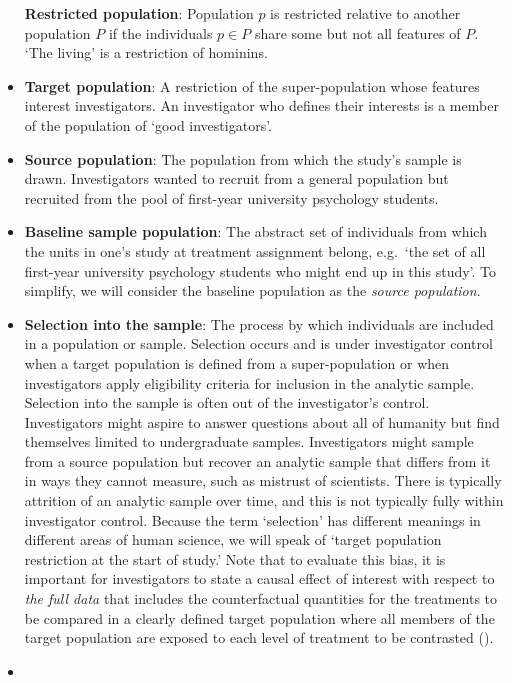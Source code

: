 \documentclass[
  single column]{article}
\begin{document}
\begin{itemize}
  \textbf{Restricted population}: Population \(p\) is restricted
  relative to another population \(P\) if the individuals \(p \in P\)
  share some but not all features of \(P\). `The living' is a
  restriction of hominins.
\item
  \textbf{Target population}: A restriction of the super-population
  whose features interest investigators. An investigator who defines
  their interests is a member of the population of `good investigators'.
\item
  \textbf{Source population}: The population from which the study's
  sample is drawn. Investigators wanted to recruit from a general
  population but recruited from the pool of first-year university
  psychology students.
\item
  \textbf{Baseline sample population}: The abstract set of individuals
  from which the units in one's study at treatment assignment belong,
  e.g.~`the set of all first-year university psychology students who
  might end up in this study'. To simplify, we will consider the
  baseline population as the \emph{source population}.
\item
  \textbf{Selection into the sample}: The process by which individuals
  are included in a population or sample. Selection occurs and is under
  investigator control when a target population is defined from a
  super-population or when investigators apply eligibility criteria for
  inclusion in the analytic sample. Selection into the sample is often
  out of the investigator's control. Investigators might aspire to
  answer questions about all of humanity but find themselves limited to
  undergraduate samples. Investigators might sample from a source
  population but recover an analytic sample that differs from it in ways
  they cannot measure, such as mistrust of scientists. There is
  typically attrition of an analytic sample over time, and this is not
  typically fully within investigator control. Because the term
  `selection' has different meanings in different areas of human
  science, we will speak of `target population restriction at the start
  of study.' Note that to evaluate this bias, it is important for
  investigators to state a causal effect of interest with respect to
  \emph{the full data} that includes the counterfactual quantities for
  the treatments to be compared in a clearly defined target population
  where all members of the target population are exposed to each level
  of treatment to be contrasted ().
\item

\end{itemize}
\end{document}
